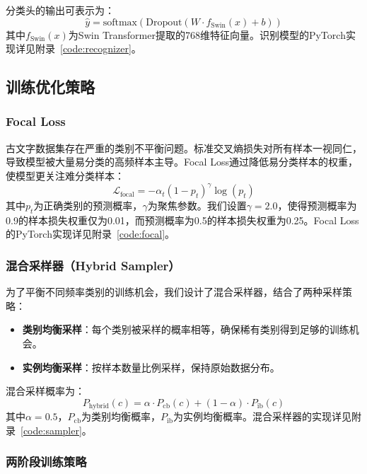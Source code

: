 \documentclass[12pt,a4paper]{article}
\begin{document}
分类头的输出可表示为：
\begin{equation}
    \hat{y} = \text{softmax}\left(\text{Dropout}\left(W \cdot f_{\text{Swin}}(x) + b\right)\right)
\end{equation}
其中$f_{\text{Swin}}(x)$为Swin Transformer提取的768维特征向量。识别模型的PyTorch实现详见附录~\ref{code:recognizer}。

\subsection{训练优化策略}

\subsubsection{Focal Loss}

古文字数据集存在严重的类别不平衡问题。标准交叉熵损失对所有样本一视同仁，导致模型被大量易分类的高频样本主导。Focal Loss通过降低易分类样本的权重，使模型更关注难分类样本：
\begin{equation}
    \mathcal{L}_{\text{focal}} = -\alpha_t (1 - p_t)^{\gamma} \log(p_t)
\end{equation}
其中$p_t$为正确类别的预测概率，$\gamma$为聚焦参数。我们设置$\gamma = 2.0$，使得预测概率为0.9的样本损失权重仅为0.01，而预测概率为0.5的样本损失权重为0.25。Focal Loss的PyTorch实现详见附录~\ref{code:focal}。

\subsubsection{混合采样器（Hybrid Sampler）}

为了平衡不同频率类别的训练机会，我们设计了混合采样器，结合了两种采样策略：
\begin{itemize}
    \item \textbf{类别均衡采样}：每个类别被采样的概率相等，确保稀有类别得到足够的训练机会。
    \item \textbf{实例均衡采样}：按样本数量比例采样，保持原始数据分布。
\end{itemize}

混合采样概率为：
\begin{equation}
    P_{\text{hybrid}}(c) = \alpha \cdot P_{\text{cb}}(c) + (1 - \alpha) \cdot P_{\text{ib}}(c)
\end{equation}
其中$\alpha = 0.5$，$P_{\text{cb}}$为类别均衡概率，$P_{\text{ib}}$为实例均衡概率。混合采样器的实现详见附录~\ref{code:sampler}。

\subsubsection{两阶段训练策略}
\end{document}
